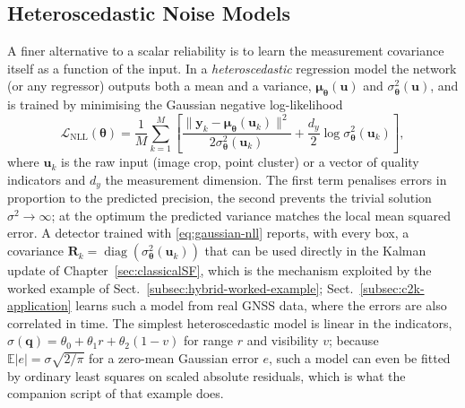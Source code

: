 \documentclass[graybox,envcountchap]{style/SNmono}
\DeclareMathOperator{\diag}{diag}
\begin{document}
\subsection{Heteroscedastic Noise Models}
\label{subsec:heteroscedastic}
A finer alternative to a scalar reliability is to learn the measurement covariance itself as a function of the input. In a \emph{heteroscedastic} regression model the network (or any regressor) outputs both a mean and a variance, $\boldsymbol{\mu}_{\boldsymbol{\theta}}(\mathbf{u})$ and $\sigma_{\boldsymbol{\theta}}^{2}(\mathbf{u})$, and is trained by minimising the Gaussian negative log-likelihood \cite{nix1994_heteroscedastic,kendall2017_uncertainties}
\begin{equation}
\mathcal{L}_{\mathrm{NLL}}(\boldsymbol{\theta})=\frac{1}{M}\sum_{k=1}^{M}\left[\frac{\|\mathbf{y}_k-\boldsymbol{\mu}_{\boldsymbol{\theta}}(\mathbf{u}_k)\|^{2}}{2\sigma_{\boldsymbol{\theta}}^{2}(\mathbf{u}_k)}+\frac{d_y}{2}\log\sigma_{\boldsymbol{\theta}}^{2}(\mathbf{u}_k)\right],
\label{eq:gaussian-nll}
\end{equation}
where $\mathbf{u}_k$ is the raw input (image crop, point cluster) or a vector of quality indicators and $d_y$ the measurement dimension. The first term penalises errors in proportion to the predicted precision, the second prevents the trivial solution $\sigma^{2}\to\infty$; at the optimum the predicted variance matches the local mean squared error. A detector trained with \eqref{eq:gaussian-nll} reports, with every box, a covariance $\mathbf{R}_k=\diag(\sigma_{\boldsymbol{\theta}}^{2}(\mathbf{u}_k))$ that can be used directly in the Kalman update of Chapter~\ref{sec:classicalSF}, which is the mechanism exploited by the worked example of Sect.~\ref{subsec:hybrid-worked-example}; Sect.~\ref{subsec:c2k-application} learns such a model from real GNSS data, where the errors are also correlated in time. The simplest heteroscedastic model is linear in the indicators, $\sigma(\mathbf{q})=\theta_0+\theta_1 r+\theta_2(1-v)$ for range $r$ and visibility $v$; because $\mathbb{E}|e|=\sigma\sqrt{2/\pi}$ for a zero-mean Gaussian error $e$, such a model can even be fitted by ordinary least squares on scaled absolute residuals, which is what the companion script of that example does.
\end{document}
